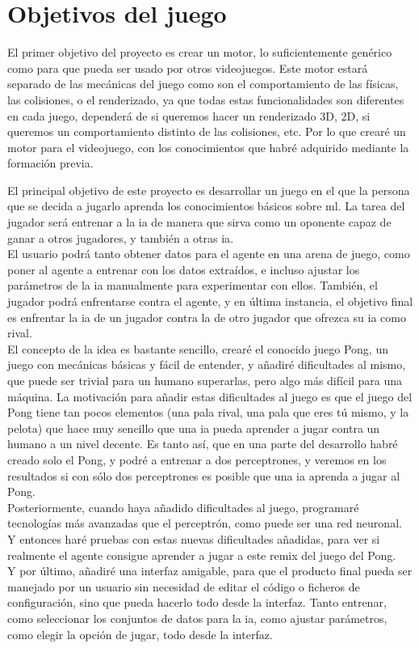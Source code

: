 \section{Objetivos del juego}
El primer objetivo del proyecto es crear un motor, lo suficientemente genérico como para que pueda ser usado por otros videojuegos. Este motor estará separado de las mecánicas del juego como son el comportamiento de las físicas, las colisiones, o el renderizado, ya que todas estas funcionalidades son diferentes en cada juego, dependerá de si queremos hacer un renderizado 3D, 2D, si queremos un comportamiento distinto de las colisiones, etc. Por lo que crearé un motor para el videojuego, con los conocimientos que habré adquirido mediante la formación previa.

El principal objetivo de este proyecto es desarrollar un juego en el que la persona que se decida a jugarlo aprenda los conocimientos básicos sobre \gls{ml}. La tarea del jugador será entrenar a la \gls{ia} de manera que sirva como un oponente capaz de ganar a otros jugadores, y también a otras \gls{ia}.
\\
El usuario podrá tanto obtener datos para el agente en una arena de juego, como poner al agente a entrenar con los datos extraídos, e incluso ajustar los parámetros de la \gls{ia} manualmente para experimentar con ellos. También, el jugador podrá enfrentarse contra el agente, y en última instancia, el objetivo final es enfrentar la \gls{ia} de un jugador contra la de otro jugador que ofrezca su \gls{ia} como rival. 
\\
El concepto de la idea es bastante sencillo, crearé el conocido juego Pong, un juego con mecánicas básicas y fácil de entender, y añadiré dificultades al mismo, que puede ser trivial para un humano superarlas, pero algo más difícil para una máquina. La motivación para añadir estas dificultades al juego es que el juego del Pong tiene tan pocos elementos (una pala rival, una pala que eres tú mismo, y la pelota) que hace muy sencillo que una \gls{ia} pueda aprender a jugar contra un humano a un nivel decente. Es tanto así, que en una parte del  desarrollo habré creado solo el Pong, y podré a entrenar a dos perceptrones, y veremos en los resultados si con sólo dos perceptrones es posible que una \gls{ia} aprenda a jugar al Pong.
\\
Posteriormente, cuando haya añadido dificultades al juego, programaré tecnologías más avanzadas que el perceptrón, como puede ser una red neuronal. Y entonces haré pruebas con estas nuevas dificultades añadidas, para ver si realmente el agente consigue aprender a jugar a este remix del juego del Pong.
\\
Y por último, añadiré una interfaz amigable, para que el producto final pueda ser manejado por un usuario sin necesidad de editar el código o ficheros de configuración, sino que pueda hacerlo todo desde la interfaz. Tanto entrenar, como seleccionar los conjuntos de datos para la \gls{ia}, como ajustar parámetros, como elegir la opción de jugar, todo desde la interfaz.

